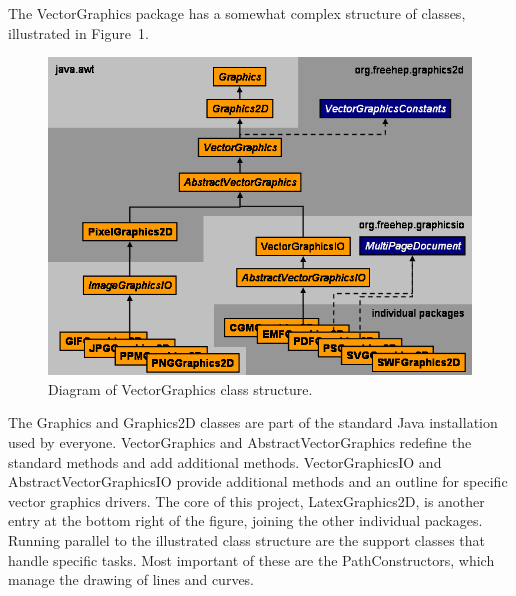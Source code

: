 \documentclass[11pt]{report}
\begin{document}
The VectorGraphics package has a somewhat complex structure of classes, illustrated in Figure~1. \begin{figure}[tb] \hspace{.6in} \includegraphics[scale=1]{ClassDiagram2} \caption{Diagram of VectorGraphics class structure.} \end{figure}  The Graphics and Graphics2D classes are part of the standard Java installation used by everyone. VectorGraphics and AbstractVectorGraphics redefine the standard methods and add additional methods. VectorGraphicsIO and AbstractVectorGraphicsIO provide additional methods and an outline for specific vector graphics drivers. The core of this project, LatexGraphics2D, is another entry at the bottom right of the figure, joining the other individual packages. Running parallel to the illustrated class structure are the support classes that handle specific tasks. Most important of these are the PathConstructors, which manage the drawing of lines and curves. 

\end{document}
